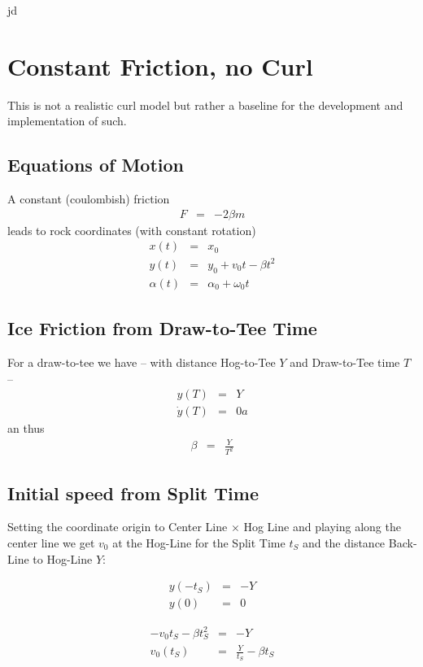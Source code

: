 jd\section{Constant Friction, no Curl} This is not a realistic curl model but 
rather a baseline for the development and implementation of such.

\subsection{Equations of Motion}
A constant (coulombish) friction
\begin{eqnarray}
F &=& -2 \beta m
\end{eqnarray}
leads to rock coordinates (with constant rotation)
\begin{eqnarray}
x(t) &=& x_0 \\
y(t) &=& y_0 + v_0 t - \beta t^2 \\
\alpha(t) &=& \alpha_0 + \omega_0 t
\end{eqnarray}

\subsection{Ice Friction from Draw-to-Tee Time}
For a draw-to-tee we have -- with distance Hog-to-Tee $Y$ and Draw-to-Tee time 
$T$ --
\begin{eqnarray}
y(T) &=& Y \\
\dot y(T) &=& 0a
\end{eqnarray}
an thus
\begin{eqnarray}
\beta &=& \frac{Y}{T^2}
\end{eqnarray}

\subsection{Initial speed from Split Time}
Setting the coordinate origin to Center Line $\times$ Hog Line and playing 
along the center line we get $v_0$ at the Hog-Line for the Split Time $t_S$ and 
the distance Back-Line to Hog-Line $Y$:

\begin{eqnarray}
y(-t_S) &=& -Y \\
y(0) &=& 0
\end{eqnarray}

\begin{eqnarray}
-v_0 t_S - \beta t_S^2 &=& -Y \\
v_0(t_S) &=& \frac{Y}{t_S} - \beta t_S
\end{eqnarray}
